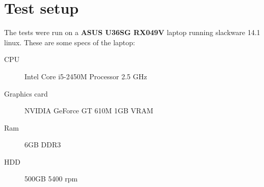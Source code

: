 
\chapter{Test setup}\label{app:setup}

The tests were run on a \textbf{ASUS U36SG RX049V} laptop running slackware 14.1 linux.  These are some specs of the laptop:


\begin{description}
    \item[CPU] Intel Core i5-2450M Processor 2.5 GHz
    \item[Graphics card] NVIDIA GeForce GT 610M 1GB VRAM
    \item[Ram] 6GB DDR3
    \item[HDD] 500GB 5400 rpm
\end{description}

